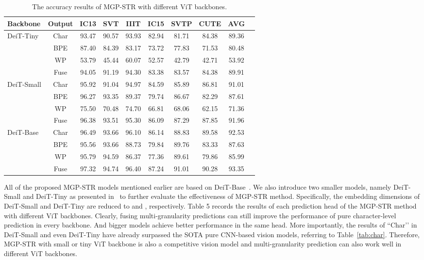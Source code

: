 \documentclass[runningheads]{llncs}
\newcommand{\ra}[1]{\renewcommand{\arraystretch}{#1}}
\begin{document}
\begin{table*}[t]\centering
\setlength{\tabcolsep}{5pt}
\ra{1}
\caption{The accuracy results of MGP-STR with different ViT backbones.}
\label{tab:y0}
\begin{tabular}{|l|c|c|c|c|c|c|c|c|c|}
\hline
Backbone & Output &IC13&SVT  &IIIT   & IC15 & SVTP &CUTE  &AVG \\
\hline
\multirow{4}{*}{DeiT-Tiny}  &  Char &93.47	&90.57	&93.93	&82.94	&81.71	&84.38	&89.36	 \\
&  BPE &87.40	&84.39	&83.17	&73.72	&77.83	&71.53	&80.48	 \\
&  WP &53.79	&45.44	&60.07	&52.57	&42.79	&42.71	&53.92	 \\
&  Fuse &94.05	&91.19	&94.30	&83.38	&83.57	&84.38	&89.91	 \\
\hline
\multirow{4}{*}{DeiT-Small}  &  Char &95.92	&91.04	&94.97	&84.59	&85.89	&86.81	&91.01	 \\
&  BPE &96.27	&93.35	&89.37	&79.74	&86.67	&82.29	&87.61	 \\
&  WP &75.50	&70.48	&74.70	&66.81	&68.06	&62.15	&71.36	 \\
&  Fuse &96.38	&93.51	&95.30	&86.09	&87.29	&87.85	&91.96	 \\
\hline
\multirow{4}{*}{DeiT-Base}  &  Char &96.49	&93.66	&96.10	&86.14	&88.83	&89.58	&92.53	 \\
&  BPE &95.56	&93.66	&88.73	&79.84	&89.76	&83.33	&87.63	 \\
&  WP  &95.79	&94.59	&86.37	&77.36	&89.61	&79.86	&85.99	 \\
&  Fuse &97.32	&94.74	&96.40	&87.24	&91.01	&90.28	&93.35	 \\
\hline
\end{tabular}
\end{table*}

All of the proposed MGP-STR models mentioned earlier are based on DeiT-Base~\cite{deit}. We also introduce two smaller models, namely DeiT-Small and DeiT-Tiny as presented in~\cite{deit} to further evaluate the effectiveness of MGP-STR method. Specifically, the embedding dimensions of DeiT-Small and DeiT-Tiny are reduced to  and , respectively. Table 5 records the results of each prediction head of the MGP-STR method with different ViT backbones. Clearly, fusing multi-granularity predictions can still improve the performance of pure character-level prediction in every backbone. And bigger models achieve better performance in the same  head. More importantly, the results of ``Char’’ in DeiT-Small and even DeiT-Tiny have already surpassed the SOTA pure CNN-based vision models, referring to Table~\ref{tab:char}. Therefore, MGP-STR with small or tiny ViT backbone is also a competitive vision model and multi-granularity prediction can also work well in different ViT backbones. 
\end{document}
